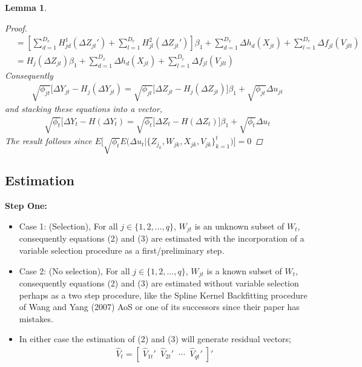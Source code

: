 \documentclass[10pt]{article}
\newtheorem{lemma}{Lemma}
\begin{document}
\begin{lemma}
\begin{proof}
\begin{align*}
%
& = \left[\sum_{d=1}^{D_x} H^1_{jd}(\Delta Z_{jt}') + \sum_{l=1}^{D_v} H^2_{jl}(\Delta Z_{jt}')  \right] \beta_1 + \sum_{d=1}^{D_x} \Delta h_{d}(X_{jt}) + \sum_{l=1}^{D_v} \Delta f_{jl}(V_{jlt}) \\
%
& = H_j(\Delta Z_{jt})\beta_1  + \sum_{d=1}^{D_x} \Delta h_{d}(X_{jt}) + \sum_{l=1}^{D_v} \Delta f_{jl}(V_{jlt}) 
\end{align*}
Consequently 
\begin{align*} 
\sqrt{\phi_{jt}}[\Delta Y_{jt} - H_j(\Delta Y_{jt} )    =  \sqrt{\phi_{jt}}\big[ \Delta Z_{jt} - H_j(\Delta Z_{jt}) \big]\beta_1 + \sqrt{\phi_{jt}}\Delta u_{jt}
\end{align*}
and stacking these equations into a vector,
\begin{align*} 
\sqrt{\phi_{t}}[\Delta Y_{t} - H(\Delta Y_{t} )    = \sqrt{\phi_t} \big[ \Delta Z_{t} - H(\Delta Z_{t}) \big]\beta_1 + \sqrt{\phi_t}\Delta u_{t}
\end{align*}
The result follows since $E\big[ \sqrt{\phi_t} E\big(\Delta u_{t}|\{Z_{j_k},W_{jk},X_{jk},V_{jk} \}_{k=1}^t\big) \big] = 0$ 
\end{proof}
\end{lemma}
\subsection*{Estimation} 

\noindent \bf Step One: \rm 
\begin{itemize} 
    \item Case 1: (Selection), For all $j\in \{ 1,2, \ldots ,q\}$, $W_{jt}$ is an unknown subset of $W_t$, consequently equations (2) and (3) are estimated with the incorporation of a variable selection procedure as a first/preliminary step.
    \item Case 2: (No selection), For all $j\in \{ 1,2, \ldots ,q\}$, $W_{jt}$ is a known subset of $W_t$, consequently equations (2) and (3) are estimated without variable selection perhaps as a two step procedure, like the Spline Kernel Backfitting procedure of Wang and Yang (2007) AoS or one of its successors since their paper has mistakes.  
    \item In either case the estimation of (2) and (3) will generate residual vectors; 
    \begin{align*}
    \hat{V}_t = [\;  \hat{V}_{1t}' \;\; \hat{V}_{2t}' \;\; \cdots \;\;  \hat{V}_{qt}' \; ]'
    \end{align*}
\end{itemize}
\end{document}
